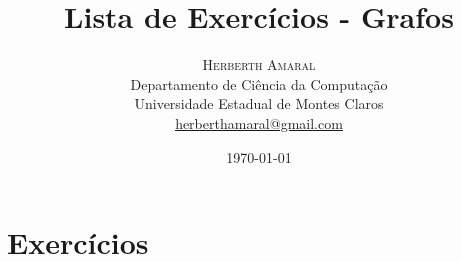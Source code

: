 \documentclass[11pt]{article}
\title{\vspace{.5cm}\fontsize{24pt}{10pt}\selectfont\textbf{\sc Lista de Exercícios - Grafos}} %
\author{
\large
\textsc{Herberth Amaral}\\[2mm] %
\normalsize Departamento de Ciência da Computação \\
\normalsize Universidade Estadual de Montes Claros \\
\normalsize \href{mailto:herberthamaral@gmail.com}{herberthamaral@gmail.com} %
\vspace{-5mm}
}
\date{\today}
\begin{document}
\maketitle %

\thispagestyle{fancy} %

%
% 

\newpage

\section{Exercícios}
\end{document}
